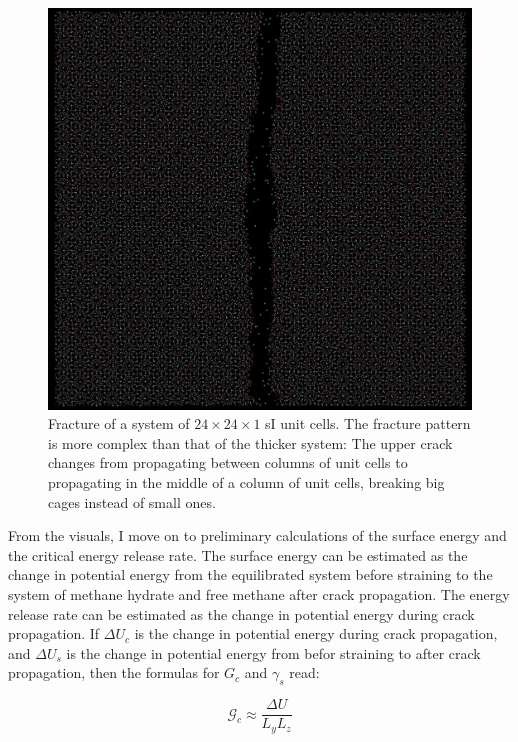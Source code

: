 \begin{figure}
\includegraphics[width=\textwidth]{../pictures/slim_system.pdf}
\caption{Fracture of a system of $24 \times 24 \times 1$ sI unit cells. The fracture pattern is more complex than that of the thicker system: The upper crack changes from propagating between columns of unit cells to propagating in the middle of a column of unit cells, breaking big cages instead of small ones.}
\label{fig:thin_crack}
\end{figure}

From the visuals, I move on to preliminary calculations of the surface energy and the critical energy release rate. The surface energy can be estimated as the change in potential energy from the equilibrated system before straining to the system of methane hydrate and free methane after crack propagation. The energy release rate can be estimated as the change in potential energy during crack propagation. If $\Delta U_c$ is the change in potential energy during crack propagation, and $\Delta U_s$ is the change in potential energy from befor straining to after crack propagation, then the formulas for $G_c$ and $\gamma_s$ read:

\begin{equation}
	\mathcal{G}_c \approx \frac{\Delta U}{L_yL_z}
\end{equation}

